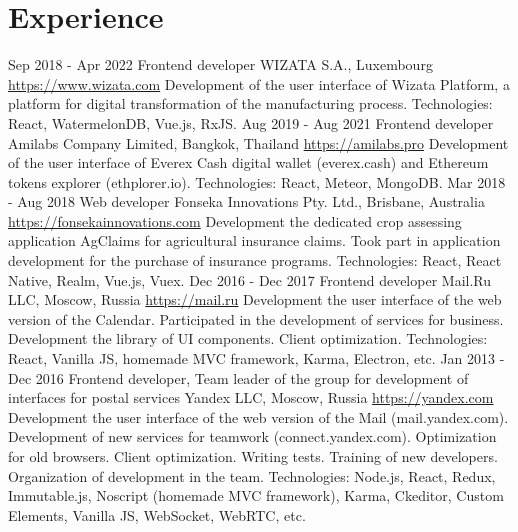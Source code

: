 \documentclass[11pt,a4paper]{moderncv}
\begin{document}
\newpage

\section{Experience}
\cventry
  {Sep 2018 - Apr 2022}
  {Frontend developer}
  {WIZATA S.A., Luxembourg}
  {\newline{}\url{https://www.wizata.com}}{}
  {Development of the user interface of Wizata Platform, a platform for digital transformation of the manufacturing process.\newline{}
  Technologies: React, WatermelonDB, Vue.js, RxJS.}
\cventry
  {Aug 2019 - Aug 2021}
  {Frontend developer}
  {Amilabs Company Limited, Bangkok, Thailand}
  {\newline{}\url{https://amilabs.pro}}{}
  {Development of the user interface of Everex Cash digital wallet (everex.cash) and Ethereum tokens explorer (ethplorer.io).\newline{}
  Technologies: React, Meteor, MongoDB.}
\cventry
  {Mar 2018 - Aug 2018}
  {Web developer}
  {Fonseka Innovations Pty. Ltd., Brisbane, Australia}
  {\newline{}\url{https://fonsekainnovations.com}}{}
  {Development the dedicated crop assessing application AgClaims for agricultural insurance claims.\newline{}
  Took part in application development for the purchase of insurance programs.\newline{}
  Technologies: React, React Native, Realm, Vue.js, Vuex.}
\cventry
  {Dec 2016 - Dec 2017}
  {Frontend developer}
  {Mail.Ru LLC, Moscow, Russia}
  {\newline{}\url{https://mail.ru}}{}
  {Development the user interface of the web version of the Calendar.\newline{}
  Participated in the development of services for business.\newline{}
  Development the library of UI components. Client optimization.\newline{}
  Technologies: React, Vanilla JS, homemade MVC framework, Karma, Electron, etc.}
\cventry
  {Jan 2013 - Dec 2016}
  {Frontend developer, Team leader of the group for development of interfaces for postal services}
  {Yandex LLC, Moscow, Russia}
  {\newline{}\url{https://yandex.com}}{}
  {Development the user interface of the web version of the Mail (mail.yandex.com).\newline{}
  Development of new services for teamwork (connect.yandex.com).\newline{}
  Optimization for old browsers. Client optimization. Writing tests.\newline{}
  Training of new developers. Organization of development in the team.\newline{}
  Technologies: Node.js, React, Redux, Immutable.js, Noscript (homemade MVC framework), Karma, Ckeditor, Custom Elements, Vanilla JS, WebSocket, WebRTC, etc.}
\end{document}
